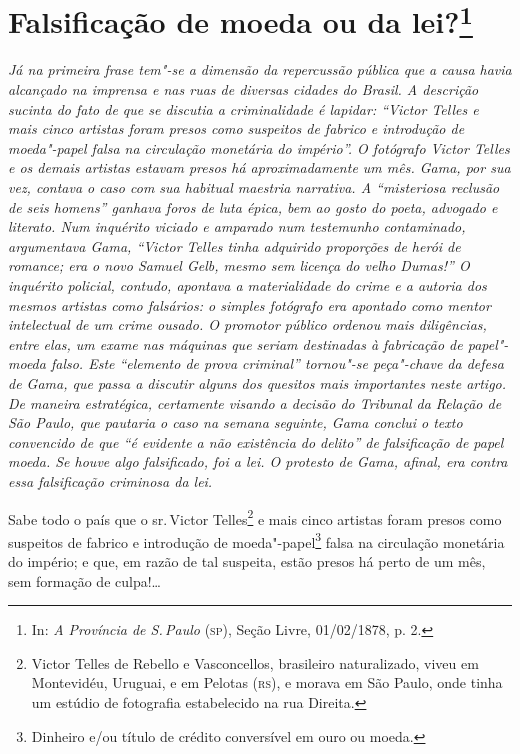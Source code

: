 \chapter{Falsificação de moeda ou da lei?\footnote[*]{In: \emph{A
  Província de S.\,Paulo} (\textsc{sp}), Seção Livre, 01/02/1878, p. 2.}}

\begin{flushleft}
{\footnotesize\itshape
Já na primeira frase tem"-se a dimensão da repercussão pública que a causa
havia alcançado na imprensa e nas ruas de diversas cidades do Brasil. A
descrição sucinta do fato de que se discutia a criminalidade é lapidar:
``Victor Telles e mais cinco artistas foram presos como suspeitos de
fabrico e introdução de moeda"-papel falsa na circulação monetária do
império''. O fotógrafo Victor Telles e os demais artistas estavam presos
há aproximadamente um mês. Gama, por sua vez, contava o caso com sua
habitual maestria narrativa. A ``misteriosa reclusão de seis homens''
ganhava foros de luta épica, bem ao gosto do poeta, advogado e literato.
Num inquérito viciado e amparado num testemunho contaminado, argumentava Gama, ``Victor
Telles tinha adquirido proporções de herói de romance; era o novo Samuel
Gelb, mesmo sem licença do velho Dumas!'' O inquérito policial, contudo,
apontava a materialidade do crime e a autoria dos mesmos artistas como
falsários: o simples fotógrafo era apontado como mentor intelectual de
um crime ousado. O promotor público ordenou mais diligências, entre
elas, um exame nas máquinas que seriam destinadas à fabricação de
papel"-moeda falso. Este ``elemento de prova criminal''
tornou"-se peça"-chave da defesa de Gama, que passa a discutir alguns dos quesitos
mais importantes neste artigo. De maneira estratégica, certamente
visando a decisão do Tribunal da Relação de São Paulo, que pautaria o
caso na semana seguinte, Gama conclui o texto convencido
de que ``é evidente a não existência do delito'' de falsificação de
papel moeda. Se houve algo falsificado, foi a lei. O protesto de Gama,
afinal, era contra essa falsificação criminosa da lei. }
\end{flushleft}

\noindent{}Sabe todo o país que o sr.\,Victor Telles\footnote{Victor Telles de
  Rebello e Vasconcellos, brasileiro naturalizado, viveu em Montevidéu,
  Uruguai, e em Pelotas (\textsc{rs}), e morava em São Paulo, onde tinha um estúdio de
  fotografia estabelecido na rua Direita.} e mais cinco artistas foram
presos como suspeitos de fabrico e introdução de moeda"-papel\footnote{
  Dinheiro e/ou título de crédito conversível em ouro ou moeda.} falsa
na circulação monetária do império; e que, em razão de tal suspeita,
estão presos há perto de um mês, sem formação de culpa!\ldots{}

